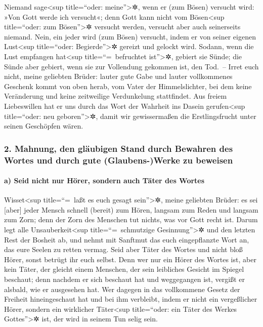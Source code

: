  Niemand sage\textless sup title=``oder:
meine''\textgreater✲, wenn er (zum Bösen) versucht wird: »Von Gott werde
ich versucht«; denn Gott kann nicht vom Bösen\textless sup title=``oder:
zum Bösen''\textgreater✲ versucht werden, versucht aber auch seinerseits
niemand.  Nein, ein jeder wird (zum Bösen) versucht,
indem er von seiner eigenen Lust\textless sup title=``oder:
Begierde''\textgreater✲ gereizt und gelockt wird. 
Sodann, wenn die Lust empfangen hat\textless sup title=``=~befruchtet
ist''\textgreater✲, gebiert sie Sünde; die Sünde aber gebiert, wenn sie
zur Vollendung gekommen ist, den Tod.~--  Irret euch
nicht, meine geliebten Brüder:  lauter gute Gabe und
lauter vollkommenes Geschenk kommt von oben herab, vom Vater der
Himmelslichter, bei dem keine Veränderung und keine zeitweilige
Verdunkelung stattfindet.  Aus freiem Liebeswillen hat er
uns durch das Wort der Wahrheit ins Dasein gerufen\textless sup
title=``oder: neu geboren''\textgreater✲, damit wir gewissermaßen die
Erstlingsfrucht unter seinen Geschöpfen wären.

\hypertarget{mahnung-den-gluxe4ubigen-stand-durch-bewahren-des-wortes-und-durch-gute-glaubens-werke-zu-beweisen}{%
\subsubsection{2. Mahnung, den gläubigen Stand durch Bewahren des Wortes
und durch gute (Glaubens-)Werke zu
beweisen}\label{mahnung-den-gluxe4ubigen-stand-durch-bewahren-des-wortes-und-durch-gute-glaubens-werke-zu-beweisen}}

\hypertarget{a-seid-nicht-nur-huxf6rer-sondern-auch-tuxe4ter-des-wortes}{%
\paragraph{a) Seid nicht nur Hörer, sondern auch Täter des
Wortes}\label{a-seid-nicht-nur-huxf6rer-sondern-auch-tuxe4ter-des-wortes}}

 Wisset\textless sup title=``=~laßt es euch gesagt
sein''\textgreater✲, meine geliebten Brüder: es sei {[}aber{]} jeder
Mensch schnell (bereit) zum Hören, langsam zum Reden und langsam zum
Zorn;  denn der Zorn des Menschen tut nichts, was vor
Gott recht ist.  Darum legt alle
Unsauberkeit\textless sup title=``=~schmutzige Gesinnung''\textgreater✲
und den letzten Rest der Bosheit ab, und nehmt mit Sanftmut das euch
eingepflanzte Wort an, das eure Seelen zu retten vermag. 
Seid aber Täter des Wortes und nicht bloß Hörer, sonst betrügt ihr euch
selbst.  Denn wer nur ein Hörer des Wortes ist, aber kein
Täter, der gleicht einem Menschen, der sein leibliches Gesicht im
Spiegel beschaut;  denn nachdem er sich beschaut hat und
weggegangen ist, vergißt er alsbald, wie er ausgesehen hat.
 Wer dagegen in das vollkommene Gesetz der Freiheit
hineingeschaut hat und bei ihm verbleibt, indem er nicht ein
vergeßlicher Hörer, sondern ein wirklicher Täter\textless sup
title=``oder: ein Täter des Werkes Gottes''\textgreater✲ ist, der wird
in seinem Tun selig sein.


